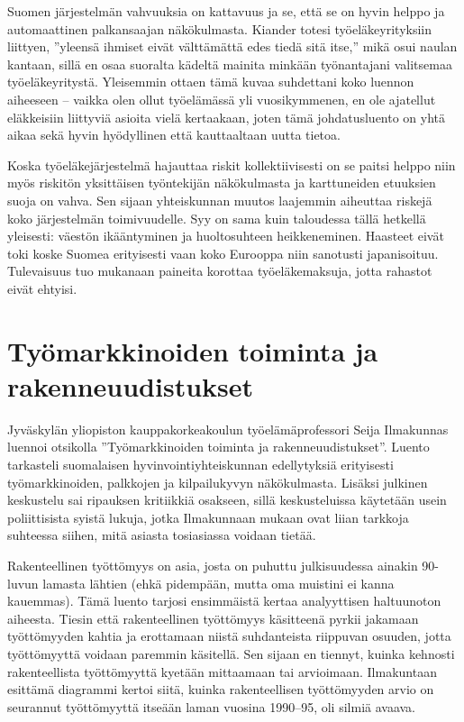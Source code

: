 \documentclass[12pt]{article}
\begin{document}
Suomen järjestelmän vahvuuksia on kattavuus ja se, että se on hyvin helppo ja automaattinen palkansaajan näkökulmasta. Kiander totesi työeläkeyrityksiin liittyen, ''yleensä ihmiset eivät välttämättä edes tiedä sitä itse,'' mikä osui naulan kantaan, sillä en osaa suoralta kädeltä mainita minkään työnantajani valitsemaa työeläkeyritystä. Yleisemmin ottaen tämä kuvaa suhdettani koko luennon aiheeseen -- vaikka olen ollut työelämässä yli vuosikymmenen, en ole ajatellut eläkkeisiin liittyviä asioita vielä kertaakaan, joten tämä johdatusluento on yhtä aikaa sekä hyvin hyödyllinen että kauttaaltaan uutta tietoa.

Koska työeläkejärjestelmä hajauttaa riskit kollektiivisesti on se paitsi helppo niin myös riskitön yksittäisen työntekijän näkökulmasta ja karttuneiden etuuksien suoja on vahva. Sen sijaan yhteiskunnan muutos laajemmin aiheuttaa riskejä koko järjestelmän toimivuudelle. Syy on sama kuin taloudessa tällä hetkellä yleisesti: väestön ikääntyminen ja huoltosuhteen heikkeneminen. Haasteet eivät toki koske Suomea erityisesti vaan koko Eurooppa niin sanotusti japanisoituu. Tulevaisuus tuo mukanaan paineita korottaa työeläkemaksuja, jotta rahastot eivät ehtyisi.


\newpage
\section{Työmarkkinoiden toiminta ja rakenneuudistukset}

Jyväskylän yliopiston kauppakorkeakoulun työelämäprofessori Seija Ilmakunnas luennoi otsikolla ''Työmarkkinoiden toiminta ja rakenneuudistukset''. Luento tarkasteli suomalaisen hyvinvointiyhteiskunnan edellytyksiä erityisesti työmarkkinoiden, palkkojen ja kilpailukyvyn näkökulmasta. Lisäksi julkinen keskustelu sai ripauksen kritiikkiä osakseen, sillä keskusteluissa käytetään usein poliittisista syistä lukuja, jotka Ilmakunnaan mukaan ovat liian tarkkoja suhteessa siihen, mitä asiasta tosiasiassa voidaan tietää.

Rakenteellinen työttömyys on asia, josta on puhuttu julkisuudessa ainakin 90-luvun lamasta lähtien (ehkä pidempään, mutta oma muistini ei kanna kauemmas). Tämä luento tarjosi ensimmäistä kertaa analyyttisen haltuunoton aiheesta. Tiesin että rakenteellinen työttömyys käsitteenä pyrkii jakamaan työttömyyden kahtia ja erottamaan niistä suhdanteista riippuvan osuuden, jotta työttömyyttä voidaan paremmin käsitellä. Sen sijaan en tiennyt, kuinka kehnosti rakenteellista työttömyyttä kyetään mittaamaan tai arvioimaan. Ilmakuntaan esittämä diagrammi kertoi siitä, kuinka rakenteellisen työttömyyden arvio on seurannut työttömyyttä itseään laman vuosina 1990--95, oli silmiä avaava.
\end{document}
